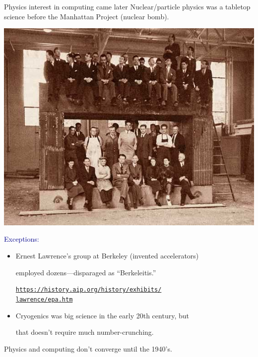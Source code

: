 \documentclass[aspectratio=169]{beamer}
\begin{document}
\begin{frame}{Physics interest in computing came later}
\Large
\vspace{0.5 cm}
Nuclear/particle physics was a tabletop science before the Manhattan Project (nuclear bomb).

\normalsize
\vspace{0.75 cm}
\hfill\includegraphics[height=2.5 cm]{bigsci-lblstaff.jpg}

\vspace{-3 cm}
\textcolor{darkblue}{\large Exceptions:}
\begin{itemize}
\item Ernest Lawrence's group at Berkeley (invented accelerators)

employed dozens---disparaged as ``Berkeleitis.''

\textcolor{blue}{\small\href{https://history.aip.org/history/exhibits/lawrence/epa.htm}{\tt https://history.aip.org/history/exhibits/\\lawrence/epa.htm}}

\item Cryogenics was big science in the early 20th century, but

that doesn't require much number-crunching.
\end{itemize}

\Large
\vspace{0.5 cm}
Physics and computing don't converge until the 1940's.
\end{frame}
\end{document}
